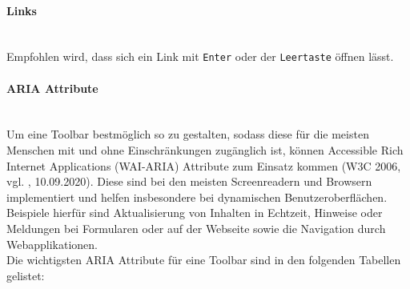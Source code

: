 \paragraph{Links}\mbox{}\\
Empfohlen wird, dass sich ein Link mit \texttt{Enter} oder der  \texttt{Leertaste} öffnen lässt.  

\paragraph{ARIA Attribute}\mbox{}\\
Um eine Toolbar bestmöglich so zu gestalten, sodass diese für die meisten Menschen mit und ohne 
Einschränkungen zugänglich ist, können Accessible Rich Internet Applications (WAI-ARIA) Attribute zum Einsatz kommen (W3C 2006, vgl. \cite{wai_aria_2020}, 10.09.2020).  
Diese sind bei den meisten Screenreadern und Browsern implementiert und helfen insbesondere bei dynamischen 
Benutzeroberflächen. Beispiele hierfür sind Aktualisierung von Inhalten in Echtzeit, Hinweise oder Meldungen  bei 
Formularen oder auf der Webseite sowie die Navigation durch Webapplikationen. \\
Die wichtigsten ARIA Attribute für eine Toolbar sind in den folgenden Tabellen gelistet:

